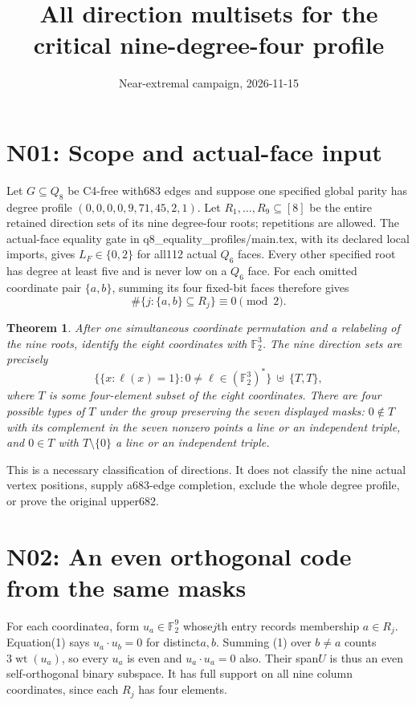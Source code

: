 \documentclass{article}
\newtheorem{theorem}{Theorem}
\begin{document}
\title{All direction multisets for the critical nine-degree-four profile}
\author{Near-extremal campaign, 2026-11-15}
\maketitle
\section{N01: Scope and actual-face input}
Let $G\subseteq Q_8$ be C4-free with683 edges and suppose one specified
global parity has degree profile $(0,0,0,0,9,71,45,2,1)$.
Let $R_1,\ldots,R_9\subseteq[8]$ be the entire retained direction sets
of its nine degree-four roots; repetitions are allowed.
The actual-face equality gate in q8\_equality\_profiles/main.tex,
with its declared local imports, gives $L_F\in\{0,2\}$ for all112
actual $Q_6$ faces. Every other specified root has degree at least five
and is never low on a $Q_6$ face. For each omitted coordinate pair
$\{a,b\}$, summing its four fixed-bit faces therefore gives
\[
       \#\{j:\{a,b\}\subseteq R_j\}\equiv0\pmod2.       \tag{1}
\]
\begin{theorem}
After one simultaneous coordinate permutation and a relabeling of the
nine roots, identify the eight coordinates with $\mathbb F_2^3$.
The nine direction sets are precisely
\[
 \{\{x:\ell(x)=1\}:0\ne\ell\in(\mathbb F_2^3)^*\}
                 \ \mathbin{\uplus}\ \{T,T\},          \tag{2}
\]
where $T$ is some four-element subset of the eight coordinates.
There are four possible types of $T$ under the group preserving the
seven displayed masks: $0\notin T$ with its complement in the seven
nonzero points a line or an independent triple, and $0\in T$ with
$T\setminus\{0\}$ a line or an independent triple.
\end{theorem}
This is a necessary classification of directions. It does not classify
the nine actual vertex positions, supply a683-edge completion, exclude
the whole degree profile, or prove the original upper682.

\section{N02: An even orthogonal code from the same masks}
For each coordinate$a$, form $u_a\in\mathbb F_2^9$ whose$j$th entry
records membership $a\in R_j$. Equation(1) says
$u_a\cdot u_b=0$ for distinct$a,b$. Summing (1) over $b\ne a$
counts $3\operatorname{wt}(u_a)$, so every $u_a$ is even and
$u_a\cdot u_a=0$ also. Their span$U$ is thus an even self-orthogonal
binary subspace. It has full support on all nine column coordinates,
since each $R_j$ has four elements.
\end{document}
